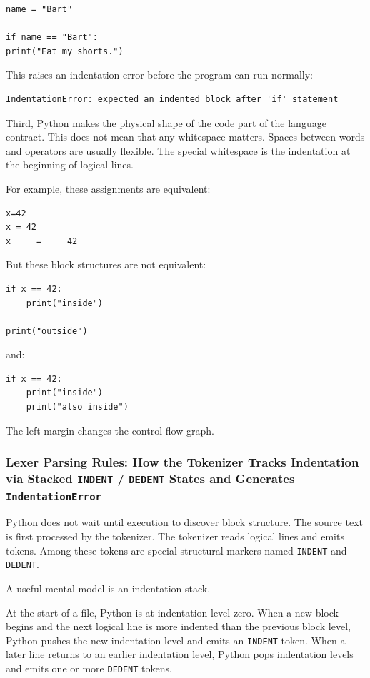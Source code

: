 \begin{verbatim}
name = "Bart"

if name == "Bart":
print("Eat my shorts.")
\end{verbatim}

This raises an indentation error before the program can run normally:

\begin{verbatim}
IndentationError: expected an indented block after 'if' statement
\end{verbatim}

Third, Python makes the physical shape of the code part of the language contract. This does not mean that any whitespace matters. Spaces between words and operators are usually flexible. The special whitespace is the indentation at the beginning of logical lines.

For example, these assignments are equivalent:

\begin{verbatim}
x=42
x = 42
x     =     42
\end{verbatim}

But these block structures are not equivalent:

\begin{verbatim}
if x == 42:
    print("inside")

print("outside")
\end{verbatim}

and:

\begin{verbatim}
if x == 42:
    print("inside")
    print("also inside")
\end{verbatim}

The left margin changes the control-flow graph.

\subsubsection{Lexer Parsing Rules: How the Tokenizer Tracks Indentation via Stacked \texttt{INDENT} / \texttt{DEDENT} States and Generates \texttt{IndentationError}}

Python does not wait until execution to discover block structure. The source text is first processed by the tokenizer. The tokenizer reads logical lines and emits tokens. Among these tokens are special structural markers named \texttt{INDENT} and \texttt{DEDENT}.

A useful mental model is an indentation stack.

At the start of a file, Python is at indentation level zero. When a new block begins and the next logical line is more indented than the previous block level, Python pushes the new indentation level and emits an \texttt{INDENT} token. When a later line returns to an earlier indentation level, Python pops indentation levels and emits one or more \texttt{DEDENT} tokens.


